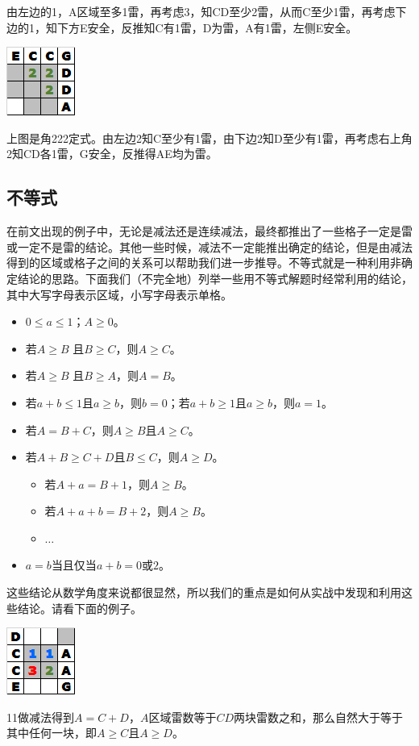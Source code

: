 由左边的1，A区域至多1雷，再考虑3，知CD至少2雷，从而C至少1雷，再考虑下边的1，知下方E安全，反推知C有1雷，D为雷，A有1雷，左侧E安全。

\vspace{5mm}
\begin{center}
    \includegraphics{trick/减法6.png}
\end{center}
上图是角222定式。由左边2知C至少有1雷，由下边2知D至少有1雷，再考虑右上角2知CD各1雷，G安全，反推得AE均为雷。

\subsection{不等式}
在前文出现的例子中，无论是减法还是连续减法，最终都推出了一些格子一定是雷或一定不是雷的结论。其他一些时候，减法不一定能推出确定的结论，但是由减法得到的区域或格子之间的关系可以帮助我们进一步推导。不等式就是一种利用非确定结论的思路。下面我们（不完全地）列举一些用不等式解题时经常利用的结论，其中大写字母表示区域，小写字母表示单格。

\begin{itemize}
    \item $0\le a\le 1$；$A\ge 0$。
    \item 若$A\ge B$ 且$B\ge C$，则$A\ge C$。
    \item 若$A\ge B$ 且$B\ge A$，则$A=B$。
    \item 若$a+b\le 1$且$a\ge b$，则$b=0$；若$a+b\ge 1$且$a\ge b$，则$a=1$。
    \item 若$A=B+C$，则$A\ge B$且$A\ge C$。
    \item 若$A+B\ge C+D$且$B\le C$，则$A\ge D$。
    \begin{itemize}
        \item 若$A+a=B+1$，则$A\ge B$。
        \item 若$A+a+b=B+2$，则$A\ge B$。
        \item $\dots$
    \end{itemize}
	\item $a=b$当且仅当$a+b=0$或$2$。
\end{itemize}

这些结论从数学角度来说都很显然，所以我们的重点是如何从实战中发现和利用这些结论。请看下面的例子。

\vspace{5mm}
\begin{center}
    \includegraphics{trick/不等式1.png}
\end{center}
11做减法得到$A=C+D$，$A$区域雷数等于$CD$两块雷数之和，那么自然大于等于其中任何一块，即$A\ge C$且$A\ge D$。

